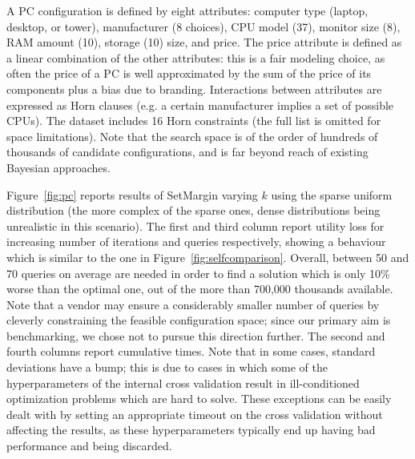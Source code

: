 \documentclass{article}
\renewcommand\[{\begin{equation}}
\renewcommand\]{\end{equation}}
\newcommand{\andrea}[1]{{\bf \textcolor{blue}{{\fbox{Andrea:} #1}}}}
\begin{document}
A PC configuration is defined by eight attributes: computer type (laptop,
desktop, or tower), manufacturer (8 choices), CPU model (37), monitor size (8), RAM amount (10), storage (10)
size, and price.
The price attribute is defined as a linear combination of the other
attributes: this is a fair modeling choice, as often the price of a PC is
well approximated by the sum of the price of its components plus a bias due to
branding.
%
Interactions between attributes are expressed as Horn clauses (e.g. a certain manufacturer implies a set of possible CPUs).
The
dataset includes 16 Horn constraints (the full list is omitted for
space limitations).
Note that the search space is of the order of hundreds of thousands of
candidate configurations, and is far beyond reach of existing Bayesian
approaches.

Figure~\ref{fig:pc} reports results of {\sc SetMargin} varying $k$
using the sparse uniform distribution (the more complex of the sparse
ones, dense distributions being unrealistic in this scenario). The
first and third column report utility loss for increasing number of
iterations and queries respectively, showing a behaviour which is
similar to the one in Figure~\ref{fig:selfcomparison}. Overall,
between 50 and 70 queries on average are needed in order to find  a
solution which is only 10\% worse than the optimal one, out of the
more than 700,000 thousands available. Note that a vendor may ensure a
considerably smaller number of queries by cleverly constraining the
feasible configuration space; since our primary aim is benchmarking,
we chose not to pursue this direction further.  The second and fourth
columns report cumulative times. Note that in some cases, standard
deviations have a bump; this is due to cases in which some of the
hyperparameters of the internal cross validation result in
ill-conditioned optimization problems which are hard to solve. These
exceptions can be easily dealt with by setting an appropriate timeout
on the cross validation without affecting the results, as these
hyperparameters typically end up having bad performance and being
discarded.
\end{document}
